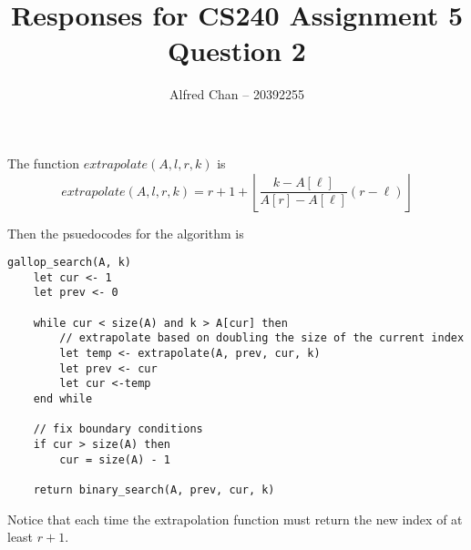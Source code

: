 \documentclass[12pt]{article}
\title{Responses for CS240 Assignment 5 Question 2}
\author{Alfred Chan -- 20392255}
\begin{document}
\maketitle

The function $extrapolate(A, l, r, k)$ is
\begin{equation}
extrapolate(A, l, r, k) = r+1+\left\lfloor\frac{k-A[\ell]}{A[r]-A[\ell]}(r-\ell)\right\rfloor
\end{equation}

Then the psuedocodes for the algorithm is
\begin{lstlisting}
gallop_search(A, k)
	let cur <- 1
	let prev <- 0

	while cur < size(A) and k > A[cur] then
		// extrapolate based on doubling the size of the current index
		let temp <- extrapolate(A, prev, cur, k)
		let prev <- cur
		let cur <-temp
	end while

	// fix boundary conditions
	if cur > size(A) then
		cur = size(A) - 1

	return binary_search(A, prev, cur, k)
\end{lstlisting}
Notice that each time the extrapolation function must return the new index of at least $r+1$.
\done
\end{document}
